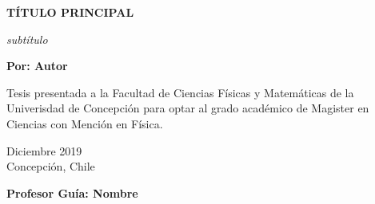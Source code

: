 \begin{titlepage}
	
	
	\thispagestyle{frontpage}
	
	\begin{center}
		
		\vspace*{4\baselineskip}
	
		
		{\Huge \textbf{TÍTULO PRINCIPAL\\}}%
		        \vspace*{1.5\baselineskip}

		\large{\textit{subtítulo}}\\ %
		
        \vspace*{1.5\baselineskip}

		\large{\textbf{Por: Autor}}\\ %
		
		\vspace{1.5\baselineskip}
		
		\large{Tesis presentada a la Facultad de Ciencias Físicas y Matemáticas de la Univerisdad de Concepción para optar al grado académico de Magister en Ciencias con Mención en Física.} %
		
		\vspace{1.5\baselineskip}
		Diciembre 2019\\ %
		Concepción, Chile %
\vspace{1.5\baselineskip}

		\large{\textbf{Profesor Guía: Nombre}}\\ %
		

	\end{center}
	

	
\end{titlepage}
